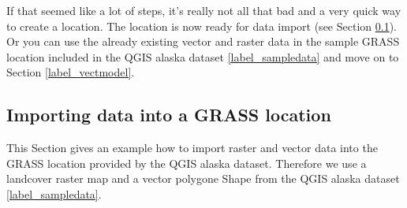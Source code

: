 If that seemed like a lot of steps, it's really not all that bad and a very 
quick way to create a location. The location  is now ready for data import (see Section \ref{sec:import_loc_data}).
Or you can use the already existing vector and raster data in the sample 
GRASS location  included in the QGIS alaska dataset \ref{label_sampledata} and move on to Section \ref{label_vectmodel}.

\subsection{Importing data into a GRASS location}\label{sec:import_loc_data}

This Section gives an example how to import raster and vector data into the  GRASS location provided by the QGIS alaska dataset. Therefore we use a landcover raster map  and a vector polygone Shape  from the QGIS alaska dataset \ref{label_sampledata}.

